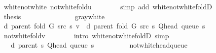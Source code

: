 \begin{isabellebody}
\ white{\isacharunderscore}{\kern0pt}not{\isacharunderscore}{\kern0pt}white\ not{\isacharunderscore}{\kern0pt}white{\isacharunderscore}{\kern0pt}fold{\isacharunderscore}{\kern0pt}u\isanewline
\ \ \ \ \ \ \isamarkupfalse%
\ {\isacharparenleft}{\kern0pt}simp\ add{\isacharcolon}{\kern0pt}\ white{\isacharunderscore}{\kern0pt}not{\isacharunderscore}{\kern0pt}white{\isacharunderscore}{\kern0pt}foldD{\isacharparenleft}{\kern0pt}{}{\isacharparenright}{\kern0pt}{\isacharparenright}{\kern0pt}\isanewline
\ \ \ \ \isamarkupfalse%
\ \isamarkupfalse%
\ {\isacharquery}{\kern0pt}thesis\isanewline
\ \ \ \ \ \ \isacommand{{\isachardot}{\kern0pt}}\isamarkupfalse%
\isanewline
\ \ \isamarkupfalse%
\isanewline
\ \ \ \ \isamarkupfalse%
\ gray{\isacharunderscore}{\kern0pt}white\isanewline
\ \ \ \ \isamarkupfalse%
\ {\isachardoublequoteopen}d\ {\isacharparenleft}{\kern0pt}parent\ {\isacharparenleft}{\kern0pt}fold\ G\ src\ s{\isacharparenright}{\kern0pt}{\isacharparenright}{\kern0pt}\ v\ {\isacharequal}{\kern0pt}\ d\ {\isacharparenleft}{\kern0pt}parent\ {\isacharparenleft}{\kern0pt}fold\ G\ src\ s{\isacharparenright}{\kern0pt}{\isacharparenright}{\kern0pt}\ {\isacharparenleft}{\kern0pt}Q{\isacharunderscore}{\kern0pt}head\ {\isacharparenleft}{\kern0pt}queue\ s{\isacharparenright}{\kern0pt}{\isacharparenright}{\kern0pt}\ {\isacharplus}{\kern0pt}\ {}{\isachardoublequoteclose}\isanewline
\ \ \ \ \ \ \isamarkupfalse%
\ not{\isacharunderscore}{\kern0pt}white{\isacharunderscore}{\kern0pt}fold{\isacharunderscore}{\kern0pt}v\isanewline
\ \ \ \ \ \ \isamarkupfalse%
\ {\isacharparenleft}{\kern0pt}intro\ white{\isacharunderscore}{\kern0pt}not{\isacharunderscore}{\kern0pt}white{\isacharunderscore}{\kern0pt}foldD{\isacharparenleft}{\kern0pt}{}{\isacharparenright}{\kern0pt}{\isacharparenright}{\kern0pt}\ simp\isanewline
\ \ \ \ \isamarkupfalse%
\ \isamarkupfalse%
\ {\isachardoublequoteopen}{\isachardot}{\kern0pt}{\isachardot}{\kern0pt}{\isachardot}{\kern0pt}\ {\isacharequal}{\kern0pt}\ d\ {\isacharparenleft}{\kern0pt}parent\ s{\isacharparenright}{\kern0pt}\ {\isacharparenleft}{\kern0pt}Q{\isacharunderscore}{\kern0pt}head\ {\isacharparenleft}{\kern0pt}queue\ s{\isacharparenright}{\kern0pt}{\isacharparenright}{\kern0pt}\ {\isacharplus}{\kern0pt}\ {}{\isachardoublequoteclose}\isanewline
\ \ \ \ \ \ \isamarkupfalse%
\ not{\isacharunderscore}{\kern0pt}white{\isacharunderscore}{\kern0pt}head{\isacharunderscore}{\kern0pt}queue\isanewline

\end{isabellebody}
